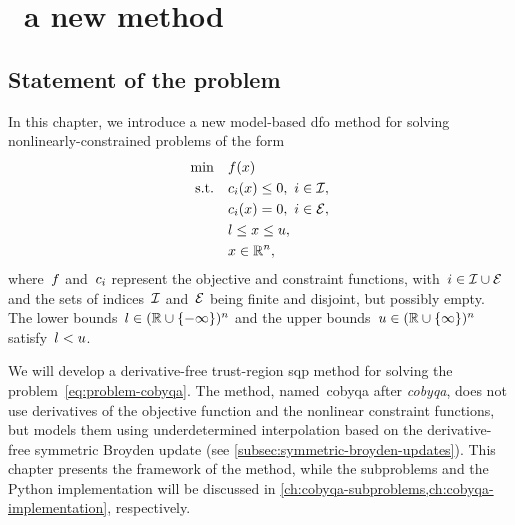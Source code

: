 %
%
%
\chapter{ \textemdash\ a new  method}
\label{ch:cobyqa-introduction}

\section{Statement of the problem}

In this chapter, we introduce a new model-based \gls{dfo} method for solving nonlinearly-constrained problems of the form
\begin{subequations}
    \label{eq:problem-cobyqa}
    \begin{align}
        \min        & \quad \obj(\iter) \label{eq:problem-cobyqa-obj}\\
        \text{s.t.} & \quad \con{i}(\iter) \le 0, ~ i \in \iub, \label{eq:problem-cobyqa-ub}\\
                    & \quad \con{i}(\iter) = 0, ~ i \in \ieq,\\
                    & \quad \xl \le x \le \xu, \label{eq:problem-cobyqa-bd}\\
                    & \quad \iter \in \R^n, \nonumber
    \end{align}
\end{subequations}
where~$f$ and~$c_{i}$ represent the objective and constraint functions, with~$i \in \mathcal{I} \cup \mathcal{E}$ and the sets of indices~$\mathcal{I}$ and~$\mathcal{E}$ being finite and disjoint, but possibly empty. 
The lower bounds~$l \in (\mathbb{R} \cup \{-\infty\})^n$ and the upper bounds~$u \in (\mathbb{R} \cup \{\infty\})^n$ satisfy~$l < u$.

We will develop a derivative-free trust-region \gls{sqp} method for solving the problem~\cref{eq:problem-cobyqa}.
The method, named~\gls{cobyqa} after \emph{\glsdesc{cobyqa}}, does not use derivatives of the objective function and the nonlinear constraint functions, but models them using underdetermined interpolation based on the derivative-free symmetric Broyden update (see \cref{subsec:symmetric-broyden-updates}).
This chapter presents the framework of the method, while the subproblems and the Python implementation will be discussed in \cref{ch:cobyqa-subproblems,ch:cobyqa-implementation}, respectively.

